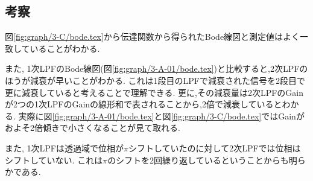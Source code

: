 \subsection{考察}
図\ref{fig:graph/3-C/bode.tex}から伝達関数から得られたBode線図と測定値はよく一致していることがわかる.

また, 1次LPFのBode線図(図\ref{fig:graph/3-A-01/bode.tex})と比較すると,2次LPFのほうが減衰が早いことがわかる.
これは1段目のLPFで減衰された信号を2段目で更に減衰していると考えることで理解できる.
更に,その減衰量は2次LPFのGainが2つの1次LPFのGainの線形和で表されることから,2倍で減衰しているとわかる.
実際に図\ref{fig:graph/3-A-01/bode.tex}と図\ref{fig:graph/3-C/bode.tex}ではGainがおよそ2倍傾きで小さくなることが見て取れる.

また, 1次LPFは透過域で位相が$\pi$シフトしていたのに対して2次LPFでは位相はシフトしていない.
これは$\pi$のシフトを2回繰り返しているということからも明らかである.
